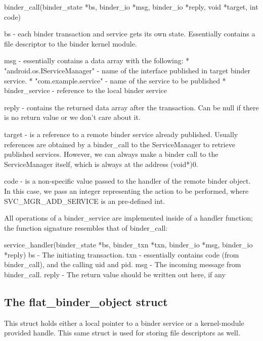 \documentclass[prodmode]{acmlarge}
\begin{document}
\begin{snippet}
binder_call(binder_state *bs, binder_io *msg, binder_io *reply, void *target, int code)

bs -     each binder transaction and service gets its own state. Essentially contains
         a file descriptor to the binder kernel module.

msg -    essentially contains a data array with the following:
         * "android.os.IServiceManager" - name of the interface published in
                                          target binder service.
          * "com.example.service"        - name of the service to be  published
          * binder_service               - reference to the local binder service

reply -   contains the returned data array after the transaction. Can be null if there
          is no return value or we don't care about it.

target -  is a reference to a remote binder service already published. Usually
          references are obtained by a binder_call to the ServiceManager to retrieve
          published services. However, we can always make a binder call to the
          ServiceManager itself, which is always at the address (void*)0.

code -    is a non-specific value passed to the handler of the remote binder object.
          In this case, we pass an integer representing the action to be performed,
          where SVC_MGR_ADD_SERVICE is an pre-defined int.
\end{snippet}

All operations of a binder\_service are implemented inside of a handler function; the function signature resembles that of binder\_call:

\begin{snippet}
service_handler(binder_state *bs, binder_txn *txn,  binder_io *msg, binder_io *reply)
bs -      The initiating transaction.
txn -     essentially contains code (from binder_call), and the calling uid and pid.
msg -     The incoming message from binder_call.
reply -   The return value should be written out here, if any
\end{snippet}

\subsection{The flat\_binder\_object struct}
This struct holds either a local pointer to a binder service or a kernel-module provided handle. This same struct is used for storing file descriptors as well.
\end{document}
